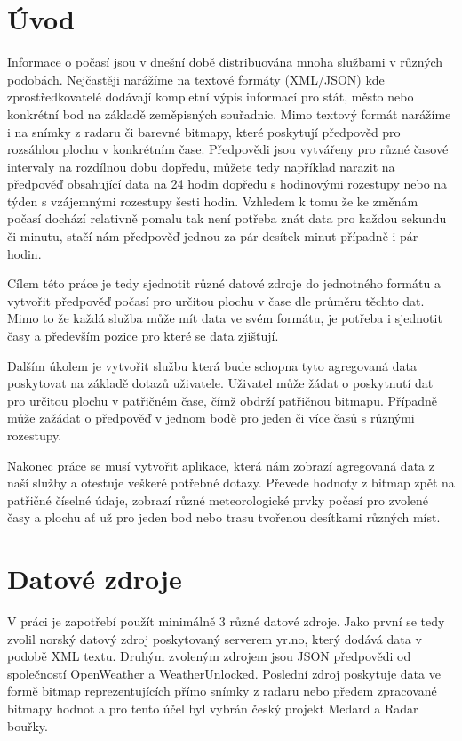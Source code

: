 \documentclass[czech,bachelor,dept460,male,csharp,cpdeclaration]{diploma}
\begin{document}
	
	\MakeTitlePages
	
	\chapter{Úvod}
	
	Informace o počasí jsou v dnešní době distribuována mnoha službami v různých podobách. Nejčastěji narážíme na textové formáty (XML/JSON) kde zprostředkovatelé dodávají kompletní výpis informací pro stát, město nebo konkrétní bod na základě zeměpisných souřadnic. Mimo textový formát narážíme i na snímky z radaru či barevné bitmapy, které poskytují předpověď pro rozsáhlou plochu v konkrétním čase. Předpovědi jsou vytvářeny pro různé časové intervaly na rozdílnou dobu dopředu, můžete tedy například narazit na předpověď obsahující data na 24 hodin dopředu s hodinovými rozestupy nebo na týden s vzájemnými rozestupy šesti hodin. Vzhledem k tomu že ke změnám počasí dochází relativně pomalu tak není potřeba znát data pro každou sekundu či minutu, stačí nám předpověď jednou za pár desítek minut případně i pár hodin.
	
	Cílem této práce je tedy sjednotit různé datové zdroje do jednotného formátu a vytvořit předpověď počasí pro určitou plochu v čase dle průměru těchto dat. Mimo to že každá služba může mít data ve svém formátu, je potřeba i sjednotit časy a především pozice pro které se data zjišťují.
	
	Dalším úkolem je vytvořit službu která bude schopna tyto agregovaná data poskytovat na základě dotazů uživatele. Uživatel může žádat o poskytnutí dat pro určitou plochu v patřičném čase, čímž obdrží patřičnou bitmapu. Případně může zažádat o předpověď v jednom bodě pro jeden či více časů s různými rozestupy.
	
	Nakonec práce se musí vytvořit aplikace, která nám zobrazí agregovaná data z naší služby a otestuje veškeré potřebné dotazy. Převede hodnoty z bitmap zpět na patřičné číselné údaje, zobrazí různé meteorologické prvky počasí pro zvolené časy a plochu ať už pro jeden bod nebo trasu tvořenou desítkami různých míst.
	
	\chapter{Datové zdroje}
	
	V práci je zapotřebí použít minimálně 3 různé datové zdroje. Jako první se tedy zvolil norský datový zdroj poskytovaný serverem yr.no, který dodává data v podobě XML textu. Druhým zvoleným zdrojem jsou JSON předpovědi od společností OpenWeather a WeatherUnlocked. Poslední zdroj poskytuje data ve formě bitmap reprezentujících přímo snímky z radaru nebo předem zpracované bitmapy hodnot a pro tento účel byl vybrán český projekt Medard a Radar bouřky.
	
\end{document}
